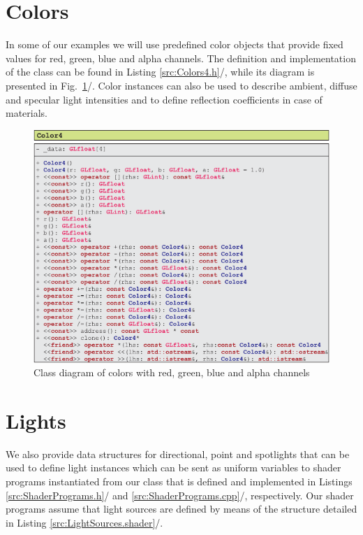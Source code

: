 \documentclass[b5paper, twosided]{book}
\newcommand{\CBlue}[1]{{\color[rgb]{0.0, 0.0, 0.9}{#1}}}
\DeclareRobustCommand{\mref}[1]{\ref{#1}{\relsize{-1}/\pageref{#1}}}
\begin{document}

\section{Colors}

In some of our examples we will use predefined color objects that provide fixed values for red, green, blue and alpha channels. The definition and implementation of the class \CBlue{Color4} can be found in Listing \mref{src:Colors4.h}, while its diagram is presented in Fig.\ \mref{fig:UMLColor4}. Color instances can also be used to describe ambient, diffuse and specular light intensities and to define reflection coefficients in case of materials.

\begin{figure}[!h]
    \centering
    \includegraphics[]{images/UMLColor4.pdf}
    \caption{Class diagram of colors with red, green, blue and alpha channels}
    \label{fig:UMLColor4}
\end{figure}


\section{Lights}

We also provide data structures for directional, point and spotlights that can be used to define light instances which can be sent as uniform variables to shader programs instantiated from our class \CBlue{ShaderProgram} that is defined and implemented in Listings \mref{src:ShaderPrograms.h} and \mref{src:ShaderPrograms.cpp}, respectively. Our shader programs assume that light sources are defined by means of the structure \CBlue{LightSource} detailed in Listing \mref{src:LightSources.shader}.
\end{document}
